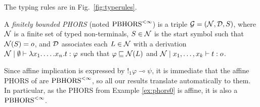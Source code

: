 The typing rules are in Fig.~\ref{fig:typerules}.
\begin{definition}[$\Gfin$]
A \emph{finitely bounded PHORS} (noted $\Gfin$) is a triple $\mathcal{G}=(\mathcal{N}, \mathcal{D}, S)$, where $\mathcal{N}$ is a finite set of typed non-terminals, $S\in\mathcal{N}$ is the {start symbol} such that $\mathcal{N}(S)=o$, and $\mathcal{D}$ associates each $L\in\mathcal{N}$ with a derivation $\mathcal{N}\mid\emptyset\vdash \lambda x_1.\dots. x_n.t:\varphi$
such that $\varphi\sqsubseteq \mathcal{N}(L)$ and $\mathcal{N}\mid x_1,\dots, x_k\vdash t:o$.
\end{definition} 

Since affine implication is expressed by $!_1\varphi\multimap \psi$, 
it is immediate that the affine PHORS of \cite{DBLP:conf/lics/LiMO22} are $\Gfin$, so all our results translate automatically to them. In particular, as the PHORS from Example \ref{ex:phors0} is affine, it is also a $\Gfin$.









%

%
%



